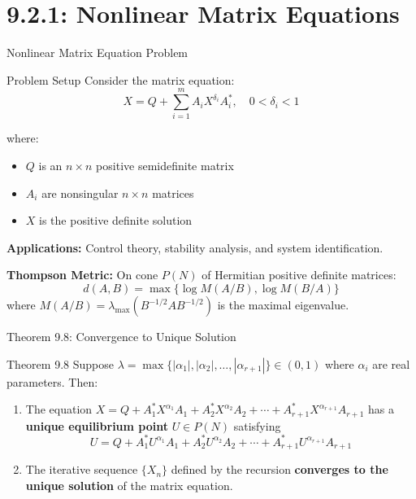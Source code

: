 \documentclass[aspectratio=169,10pt]{beamer}
\begin{document}
\section{9.2.1: Nonlinear Matrix Equations}

\begin{frame}{Nonlinear Matrix Equation Problem}
    \begin{block}{Problem Setup}
        Consider the matrix equation:
        \[X = Q + \sum_{i=1}^m A_i X^{\delta_i} A_i^*, \quad 0 < \delta_i < 1\]

        where:
        \begin{itemize}
            \item $Q$ is an $n \times n$ positive semidefinite matrix
            \item $A_i$ are nonsingular $n \times n$ matrices
            \item $X$ is the positive definite solution
        \end{itemize}
    \end{block}

    \vspace{0.3cm}

    \textbf{Applications:} Control theory, stability analysis, and system identification.

    \vspace{0.3cm}

    \textbf{Thompson Metric:} On cone $P(N)$ of Hermitian positive definite matrices:
    \[d(A,B) = \max\{\log M(A/B), \log M(B/A)\}\]
    where $M(A/B) = \lambda_{\max}(B^{-1/2}AB^{-1/2})$ is the maximal eigenvalue.
\end{frame}

\begin{frame}{Theorem 9.8: Convergence to Unique Solution}
    \begin{block}{Theorem 9.8}
        Suppose $\lambda = \max\{|\alpha_1|, |\alpha_2|, \ldots, |\alpha_{r+1}|\} \in (0,1)$ where $\alpha_i$ are real parameters. Then:

        \begin{enumerate}
            \item The equation $X = Q + A_1^* X^{\alpha_1} A_1 + A_2^* X^{\alpha_2} A_2 + \cdots + A_{r+1}^* X^{\alpha_{r+1}} A_{r+1}$ has a \textbf{unique equilibrium point} $U \in P(N)$ satisfying
            \[U = Q + A_1^* U^{\alpha_1} A_1 + A_2^* U^{\alpha_2} A_2 + \cdots + A_{r+1}^* U^{\alpha_{r+1}} A_{r+1}\]

            \item The iterative sequence $\{X_n\}$ defined by the recursion \textbf{converges to the unique solution} of the matrix equation.
        \end{enumerate}
    \end{block}
\end{frame}
\end{document}
